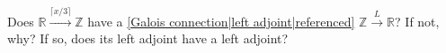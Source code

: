 

Does $\mathbb{R}\xrightarrow{\lceil x/3 \rceil}\mathbb{Z}$ have a \ref{Galois connection|left adjoint|referenced} $\mathbb{Z} \xrightarrow{L} \mathbb{R}$? If not, why? If so, does its left adjoint have a left adjoint?